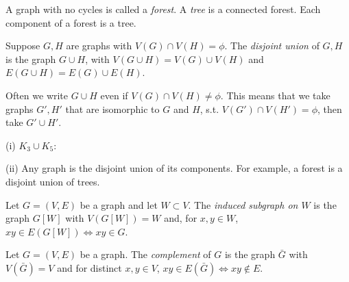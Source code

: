 \documentclass[a4paper]{article}
\begin{document}
A graph with no cycles is called a \emph{forest}. A \emph{tree} is a connected forest. Each component of a forest is a tree.

Suppose $G,H$ are graphs with $V(G) \cap V(H) = \phi$. The \emph{disjoint union} of $G,H$ is the graph $G \cup H$, with $V(G\cup H) = V(G) \cup V(H)$ and $E(G\cup H) = E(G) \cup E(H)$.

Often we write $G \cup H$ even if $V(G) \cap V(H) \neq \phi$. This means that we take graphs $G',H'$ that are isomorphic to $G$ and $H$, s.t. $V(G') \cap V(H') = \phi$, then take $G' \cup H'$.

\begin{eg}
(i) $K_3 \cup K_5$:


(ii) Any graph is the disjoint union of its components. For example, a forest is a disjoint union of trees.
\end{eg}

Let $G = (V,E)$ be a graph and let $W \subset V$. The \emph{induced subgraph on $W$} is the graph $G[W]$ with $V(G[W]) = W$ and, for $x,y \in W$, $xy \in E(G[W]) \iff xy \in G$.

Let $G = (V,E)$ be a graph. The \emph{complement} of $G$ is the graph $\bar{G}$ with $V(\bar{G}) = V$ and for distinct $x,y \in V$, $xy \in E(\bar{G}) \iff xy \not\in E$.
\end{document}
